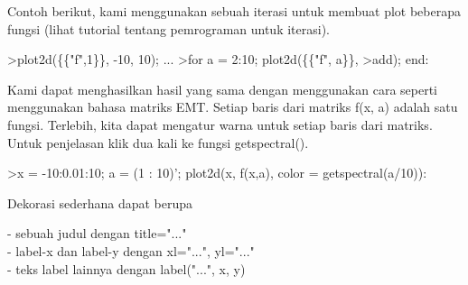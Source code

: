 \documentclass[a4paper,10pt]{article}
\begin{document}
\begin{eulernotebook}
\begin{eulercomment}
\begin{eulercomment}
\begin{eulercomment}
\begin{eulercomment}
\begin{eulercomment}
Contoh berikut, kami menggunakan sebuah iterasi untuk membuat plot
beberapa fungsi (lihat tutorial tentang pemrograman untuk iterasi).
\end{eulercomment}
\begin{eulerprompt}
>plot2d(\{\{"f",1\}\}, -10, 10); ...
>for a = 2:10; plot2d(\{\{"f", a\}\}, >add); end:
\end{eulerprompt}
\begin{eulercomment}
Kami dapat menghasilkan hasil yang sama dengan menggunakan cara
seperti menggunakan bahasa matriks EMT. Setiap baris dari matriks f(x,
a) adalah satu fungsi. Terlebih, kita dapat mengatur warna untuk
setiap baris dari matriks. Untuk penjelasan klik dua kali ke fungsi
getspectral().
\end{eulercomment}
\begin{eulerprompt}
>x = -10:0.01:10; a = (1 : 10)'; plot2d(x, f(x,a), color = getspectral(a/10)):
\end{eulerprompt}
\begin{eulercomment}
Dekorasi sederhana dapat berupa

- sebuah judul dengan title="..."\\
- label-x dan label-y dengan xl="...", yl="..."\\
- teks label lainnya dengan label("...", x, y)


\end{eulercomment}
\end{eulercomment}
\end{eulercomment}
\end{eulercomment}
\end{eulercomment}
\end{eulernotebook}
\end{document}
